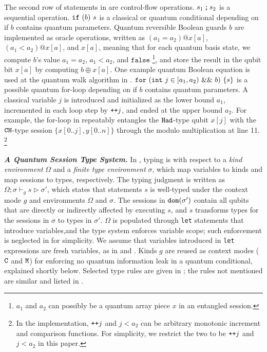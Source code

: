 The second row of statements in  are control-flow operations.
${s_1}\,\texttt{;}\,{s_2}$ is a sequential operation.
$\texttt{if}~{(b)}~{s}$ is a classical or quantum conditional depending on if $b$ contains quantum parameters.
Quantum reversible Boolean guards $b$ are implemented as \oqasm oracle operations, written as $(a_1 = a_2) @ x[a]$, $(a_1 < a_2) @ x[a]$, and $x[a]$, meaning that for each quantum basis state, we compute $b$'s value $a_1 = a_2$, $a_1 < a_2$, and $\texttt{false}$ \footnote{$a_1$ and $a_2$ can possibly be a quantum array piece $x$ in an entangled session.}, and store the result in the qubit bit $x[a]$ by computing $b \oplus x[a]$.
One example quantum Boolean equation is used at the quantum walk algorithm in .
$\texttt{for}~{(\texttt{int}~j \in [a_1,a_2)~\&\&~b)}~\{s\}$ is a possible quantum for-loop depending on if $b$ contains quantum parameters.
A classical variable $j$ is introduced and initialized as the lower bound $a_1$, incremented in each loop step by $\texttt{++}j$, and ended at the upper bound $a_2$.
For example, the for-loop in  repeatably entangles the $\texttt{Had}$-type qubit $x[j]$ with the $\texttt{CH}$-type session $\{x[0..j],y[0..n]\}$ through the modulo multiplication at line 11. 
\footnote{In the \qafny implementation, $\texttt{++}j$ and $j<a_2$ can be arbitrary monotonic increment and comparison functions. For simplicity, we restrict the two to be $\texttt{++}j$ and $j<a_2$ in this paper.}

\noindent\textbf{\textit{A Quantum Session Type System.}}\label{sec:type-checking}
%
In \qafny, typing is with respect to a \emph{kind environment} $\Omega$ and a \emph{finite type environment} $\sigma$,
which map \qafny variables to kinds and map sessions to types, respectively.
The typing judgment is written as $\Omega; \sigma\vdash_{g} s \triangleright \sigma'$,
which states that statements $s$ is well-typed under the context mode $g$ and environments $\Omega$ and $\sigma$.
The sessions in $\mathtt{dom}(\sigma')$ contain all qubits that are directly or indirectly affected by executing $s$, and $s$ transforms types for the sessions in $\sigma$ to types in $\sigma'$.
$\Omega$ is populated through \texttt{let} statements that introduce variables,and 
the type system enforces variable scope; such enforcement is neglected in  for simplicity.
We assume that variables introduced in \texttt{let} expressions are fresh variables, as in  and .
Kinds $g$ are reused as context modes ($\texttt{C}$ and $\texttt{M}$) for enforcing no quantum information leak in a quantum conditional, explained shortly below.
Selected type rules are given in ; the rules not mentioned are similar and listed in .

